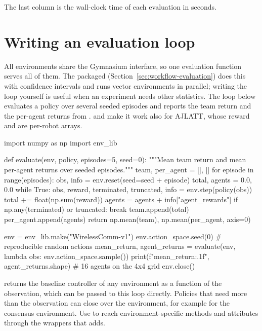 The last column is the wall-clock time of each evaluation in seconds.

\section{Writing an evaluation loop}\label{sec:examples-loop}

All environments share the Gymnasium interface, so one evaluation function
serves all of them. The packaged 
(Section~\ref{sec:workflow-evaluation}) does this with confidence intervals
and runs vector environments in parallel; writing the loop yourself is useful
when an experiment needs other statistics. The loop below evaluates a policy
over several seeded episodes and reports the team return and the per-agent
returns from .  and 
make it work also for AJLATT, whose reward and  are
per-robot arrays.

\begin{pycode}
import numpy as np
import env_lib

def evaluate(env, policy, episodes=5, seed=0):
    """Mean team return and mean per-agent returns over seeded episodes."""
    team, per_agent = [], []
    for episode in range(episodes):
        obs, info = env.reset(seed=seed + episode)
        total, agents = 0.0, 0.0
        while True:
            obs, reward, terminated, truncated, info = env.step(policy(obs))
            total += float(np.sum(reward))
            agents = agents + info["agent_rewards"]
            if np.any(terminated) or truncated:
                break
        team.append(total)
        per_agent.append(agents)
    return np.mean(team), np.mean(per_agent, axis=0)

env = env_lib.make("WirelessComm-v1")
env.action_space.seed(0)                         # reproducible random actions
mean_return, agent_returns = evaluate(env, lambda obs: env.action_space.sample())
print(f"{mean_return:.1f}", agent_returns.shape)   # 16 agents on the 4x4 grid
env.close()
\end{pycode}

 returns the baseline controller of any
environment as a function of the observation, which can be passed to this
loop directly. Policies that need more than the observation can close over the
environment, for example 
for the consensus environment. Use  to reach
environment-specific methods and attributes through the wrappers that
 adds.

